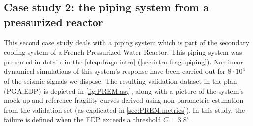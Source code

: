 \subsection{Case study 2: the piping system from a pressurized reactor}


This second case study deals with a piping system which is part of the secondary cooling system of a French Pressurized Water Reactor. This piping system was presented in details in the \cref{chap:frags-intro} (\cref{sec:intro-frags:piping}).
Nonlinear dynamical simulations of this system's response have been carried out for $8\cdot10^4$ of the seismic signals we dispose.
The resulting validation dataset in the plan (PGA,EDP) is depicted in \cref{fig:PREM:asg}, along with a picture of the system's mock-up and reference fragility curves derived using non-parametric estimation from the validation set (as explicated in \cref{sec:PREM:metrics}).
In this study, the failure is defined when the EDP exceeds a threshold $C=3.8^\circ$.





